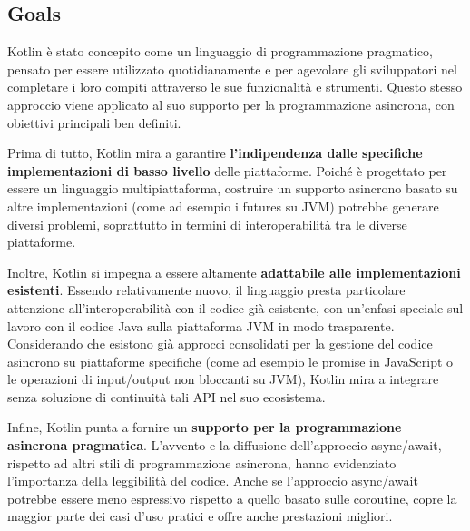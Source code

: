 \documentclass[12pt,a4paper,openright,twoside]{book}
\begin{document}
\subsection{Goals}
Kotlin è stato concepito come un linguaggio di programmazione pragmatico, pensato per essere utilizzato quotidianamente e per agevolare gli sviluppatori nel completare i loro compiti attraverso le sue funzionalità e strumenti. Questo stesso approccio viene applicato al suo supporto per la programmazione asincrona, con obiettivi principali ben definiti.

Prima di tutto, Kotlin mira a garantire \textbf{l'indipendenza dalle specifiche implementazioni di basso livello} delle piattaforme. Poiché è progettato per essere un linguaggio multipiattaforma, costruire un supporto asincrono basato su altre implementazioni (come ad esempio i futures su JVM) potrebbe generare diversi problemi, soprattutto in termini di interoperabilità tra le diverse piattaforme.

Inoltre, Kotlin si impegna a essere altamente \textbf{adattabile alle implementazioni esistenti}. Essendo relativamente nuovo, il linguaggio presta particolare attenzione all'interoperabilità con il codice già esistente, con un'enfasi speciale sul lavoro con il codice Java sulla piattaforma JVM in modo trasparente. Considerando che esistono già approcci consolidati per la gestione del codice asincrono su piattaforme specifiche (come ad esempio le promise in JavaScript o le operazioni di input/output non bloccanti su JVM), Kotlin mira a integrare senza soluzione di continuità tali API nel suo ecosistema.

Infine, Kotlin punta a fornire un \textbf{supporto per la programmazione asincrona pragmatica}. L'avvento e la diffusione dell'approccio async/await, rispetto ad altri stili di programmazione asincrona, hanno evidenziato l'importanza della leggibilità del codice. Anche se l'approccio async/await potrebbe essere meno espressivo rispetto a quello basato sulle coroutine, copre la maggior parte dei casi d'uso pratici e offre anche prestazioni migliori.
\end{document}
